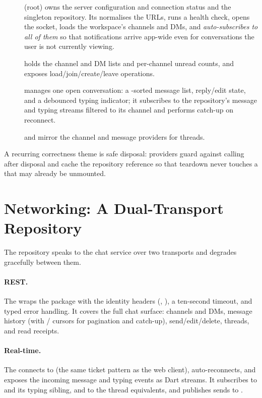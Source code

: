 \begin{description}
  \item[] (root) owns the server configuration and
  connection status and the singleton repository. Its  normalises
  the URLs, runs a health check, opens the socket, loads the workspace's channels
  and DMs, and \emph{auto-subscribes to all of them} so that notifications arrive
  app-wide even for conversations the user is not currently viewing.
  \item[] holds the channel and DM lists and per-channel
  unread counts, and exposes load/join/create/leave operations.
  \item[] manages one open conversation: a
  -sorted message list, reply/edit state, and a debounced typing
  indicator; it subscribes to the repository's message and typing streams filtered
  to its channel and performs catch-up on reconnect.
  \item[] and  mirror the channel
  and message providers for threads.
\end{description}

A recurring correctness theme is safe disposal: providers guard against calling
 after disposal and cache the repository reference so that
teardown never touches a  that may already be unmounted.

\section{Networking: A Dual-Transport Repository}

The repository speaks to the chat service over two transports and degrades
gracefully between them.

\paragraph{REST.} The  wraps the  package with the
identity headers (, ), a ten-second timeout, and
typed error handling. It covers the full chat surface: channels and DMs, message
history (with / cursors for pagination and catch-up),
send/edit/delete, threads, and read receipts.

\paragraph{Real-time.} The  connects to
 (the same ticket pattern as the web client),
auto-reconnects, and exposes the incoming message and typing events as Dart
streams. It subscribes to  and its typing sibling,
and to the thread equivalents, and publishes sends to .

